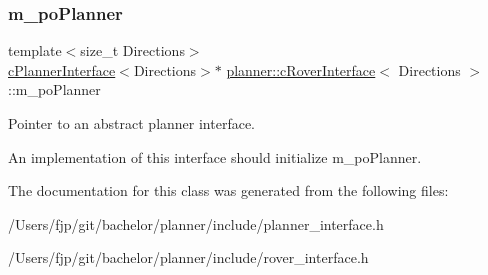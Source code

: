 \subsubsection{\texorpdfstring{m\+\_\+po\+Planner}{m\_poPlanner}}
{\footnotesize\ttfamily template$<$size\+\_\+t Directions$>$ \\
\mbox{\hyperlink{classplanner_1_1c_planner_interface}{c\+Planner\+Interface}}$<$Directions$>$$\ast$ \mbox{\hyperlink{classplanner_1_1c_rover_interface}{planner\+::c\+Rover\+Interface}}$<$ Directions $>$\+::m\+\_\+po\+Planner\hspace{0.3cm}{\ttfamily [protected]}}



Pointer to an abstract planner interface. 

An implementation of this interface should initialize m\+\_\+po\+Planner. 

The documentation for this class was generated from the following files\+:\begin{DoxyCompactItemize}
\item 
/\+Users/fjp/git/bachelor/planner/include/planner\+\_\+interface.\+h\item 
/\+Users/fjp/git/bachelor/planner/include/rover\+\_\+interface.\+h\end{DoxyCompactItemize}
